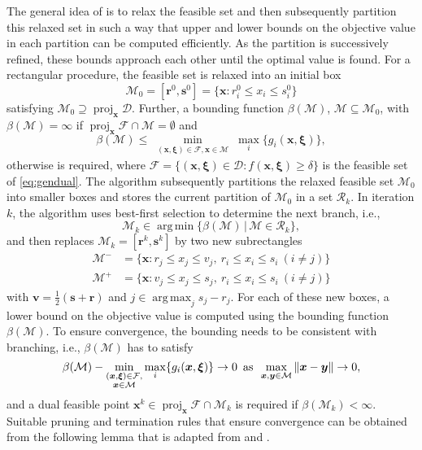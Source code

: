 \documentclass[a4paper,10pt,journal]{IEEEtran}
\DeclareMathOperator*\argmax{arg\,max}
\DeclareMathOperator*\argmin{arg\,min}
\DeclareMathOperator\proj{proj}
\let\vec\bm
\begin{document}
The general idea of  is to relax the feasible set and then subsequently partition this relaxed set in such a way that upper and lower bounds on the objective value in each partition can be computed efficiently. As the partition is successively refined, these bounds approach each other until the optimal value is found.
For a rectangular  procedure, the feasible set is relaxed into an initial box
\begin{equation}
	\mathcal M_0 = [\vec r^0, \vec s^0] = \{ \vec x : r^0_i \le x_i \le s^0_i \}
\end{equation}
satisfying $\mathcal M_0\supseteq \proj_{\vec x} \mathcal D$.
Further, a bounding function $\beta(\mathcal M)$, $\mathcal M\subseteq\mathcal M_0$, with
$\beta(\mathcal M) = \infty$ if $\proj_{\vec x} \mathcal F\cap\mathcal M = \emptyset$ and
\begin{equation} \label{eq:defbeta}
	\beta(\mathcal M) \le \min_{\substack{(\vec x, \vec\xi)\in\mathcal F, \vec x\in\mathcal M}} \max_i \{ g_i(\vec x, \vec\xi) \},
\end{equation}
otherwise is required,
where $\mathcal F =  \{ (\vec x, \vec\xi)\in \mathcal D : f(\vec x, \vec\xi) \ge \delta \}$ is the feasible set of \cref{eq:gendual}.
The algorithm subsequently partitions the relaxed feasible set $\mathcal M_0$ into smaller boxes and stores the current partition of $\mathcal M_0$ in a set $\mathscr R_k$. In iteration $k$, the algorithm uses best-first selection to determine the next branch, i.e.,
\begin{equation} \label{eq:selection}
	\mathcal M_k \in \argmin\{\beta(\mathcal M) \,|\, \mathcal M\in\mathscr R_k\},
\end{equation}
and then replaces $\mathcal M_k = [\vec r^k, \vec s^k]$ by two new subrectangles
\begin{subequations}
\label{eq:partition}
\begin{align}
	\mathcal M^- &= \{ \vec x  : r_j \le x_j \le v_j,\ r_i \le x_i \le s_i\ (i\neq j) \} \\
	\mathcal M^+ &= \{ \vec x : v_j \le x_j \le s_j,\ r_i \le x_i \le s_i\ (i\neq j) \}
\end{align}
\end{subequations}
with $\vec v = \frac{1}{2} (\vec s + \vec r)$ and $j \in\argmax_j s_j - r_j$. For each of these new boxes, a lower bound on the objective value is computed using the bounding function $\beta(\mathcal M)$. To ensure convergence, the bounding needs to be consistent with branching, i.e., $\beta(\mathcal M)$ has to satisfy
\begin{equation} \label{eq:consistent}
	\beta(\mathcal M) - \min_{\substack{(\vec x, \vec\xi)\in\mathcal F,\\ \vec x\in\mathcal M}} \max_i \{ g_i(\vec x, \vec\xi) \}
	\rightarrow 0 \enskip\mathrm{as}\enskip \max_{\vec x, \vec y\in\mathcal M} \Vert \vec x - \vec y \Vert \rightarrow 0,
\end{equation}
and a dual feasible point $\vec x^k\in\proj_{\vec x}\mathcal F\cap\mathcal M_k$ is required if $\beta(\mathcal M_k) < \infty$.
Suitable pruning and termination rules that ensure convergence can be obtained from the following lemma that is adapted from \cite[Prop.~7.14]{Tuy2016} and \cite[Prop.~5.9]{diss}.
\end{document}
